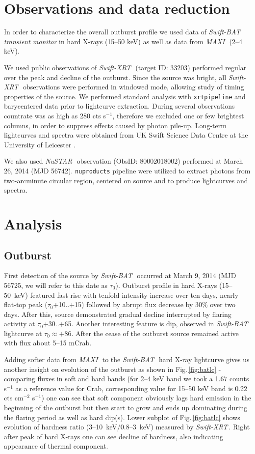 \documentclass[a4paper,fleqn,usenatbib]{mnras}
\def\swiftx{{\em Swift-XRT\,}}
\def\swiftb{{\em Swift-BAT\,}}
\def\nustar{{\em NuSTAR\,}}
\def\maxi{{\em MAXI\,}}
\begin{document}
\section{Observations and data reduction}
\label{sec:datared} 
In order to characterize the overall outburst profile we used data of \swiftb\, {\it transient monitor} \citep{krimm13bat} in hard X-rays (15--50 keV) as well as data from \maxi\, \citep{matsuoka13maxi} (2--4 keV).

We used public observations of \swiftx\, (target ID: 33203) performed regular over the peak and decline of the outburst.  Since the source was bright, all \swiftx\, observations were performed in windowed mode, allowing study of timing properties of the source. We performed standard analysis with {\texttt{xrtpipeline}} and barycentered data prior to lightcurve extraction. During several observations countrate was as high as 280 cts s$^{-1}$, therefore we excluded one or few brightest columns, in order to suppress effects caused by photon pile-up.  
Long-term lightcurves and spectra were obtained from UK Swift Science Data Centre at the University of Leicester \citep{evans09}.

We also used \nustar\, observation (ObsID: 80002018002) performed at March 26, 2014 (MJD 56742).  {\texttt{nuproducts}} pipeline were utilized to extract photons  from two-arcminute circular region, centered on source and to produce lightcurves and spectra.

\section{Analysis}
\subsection{Outburst}
First detection of the source by \swiftb\, \citep{krimm14_atel} occurred at March 9, 2014 (MJD 56725, we will refer to this date as $\tau_{0}$). Outburst profile in hard X-rays (15--50~keV) featured fast rise with tenfold intensity increase over ten days, nearly flat-top peak ($\tau_{0}$+10..+15) followed by abrupt flux decrease by 30\% over two days. After this, source demonstrated gradual decline interrupted by flaring activity at $\tau_{0}$+30..+65. Another interesting feature is dip, observed in \swiftb\, lightcurve at $\tau_{0} \approx +86$. After the cease of the outburst source remained active with flux about 5--15 mCrab. 

Adding softer data from \maxi\, to the \swiftb\, hard X-ray lightcurve gives us another insight on evolution of the outburst as shown in Fig.\,\ref{fig:batlc} - comparing fluxes in soft and hard bands (for 2--4 keV band we took a 1.67 counts s$^{-1}$ as a reference value for Crab, corresponding value for 15--50 keV band is 0.22 cts cm$^{-2}$ s$^{-1}$) one can see that soft component obviously lags hard emission in the beginning of the outburst but then start to grow and ends up dominating during the flaring period as well as hard dip(s). Lower subplot of Fig.\,\ref{fig:batlc} shows evolution of hardness ratio (3--10~keV/0.8--3~keV) measured by \swiftx. Right after peak of hard X-rays one can see decline of hardness, also indicating appearance of thermal component.
\end{document}

